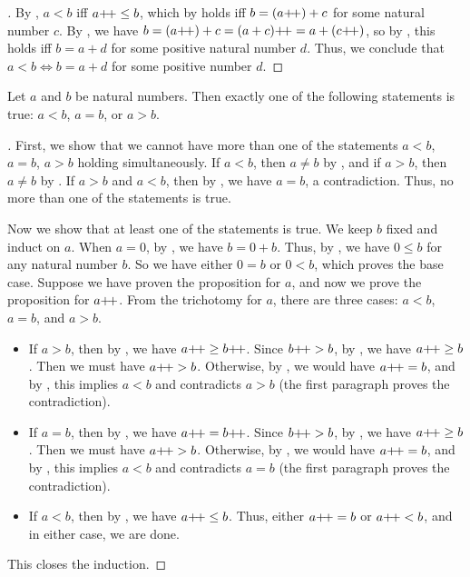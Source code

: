 \begin{proof}[]
  By , \(a < b\) iff \(a{+}\!{+} \leq b\), which by  holds iff \(b = (a{+}\!{+}) + c\) for some natural number \(c\).
  By , we have \(b = (a{+}\!{+}) + c = (a + c){+}\!{+} = a + (c{+}\!{+})\), so by , this holds iff \(b = a + d\) for some positive natural number \(d\).
  Thus, we conclude that \(a < b \iff b = a + d\) for some positive number \(d\).
\end{proof}

\begin{prop}\label{i:2.2.13}
  Let \(a\) and \(b\) be natural numbers.
  Then exactly one of the following statements is true: \(a < b\), \(a = b\), or \(a > b\).
\end{prop}

\begin{proof}[]
  First, we show that we cannot have more than one of the statements \(a < b\), \(a = b\), \(a > b\) holding simultaneously.
  If \(a < b\), then \(a \neq b\) by , and if \(a > b\), then \(a \neq b\) by .
  If \(a > b\) and \(a < b\), then by , we have \(a = b\), a contradiction.
  Thus, no more than one of the statements is true.

  Now we show that at least one of the statements is true.
  We keep \(b\) fixed and induct on \(a\).
  When \(a = 0\), by , we have \(b = 0 + b\).
  Thus, by , we have \(0 \leq b\) for any natural number \(b\).
  So we have either \(0 = b\) or \(0 < b\), which proves the base case.
  Suppose we have proven the proposition for \(a\), and now we prove the proposition for \(a{+}\!{+}\).
  From the trichotomy for \(a\), there are three cases: \(a < b\), \(a = b\), and \(a > b\).
  \begin{itemize}
    \item If \(a > b\), then by , we have \(a{+}\!{+} \geq b{+}\!{+}\).
          Since \(b{+}\!{+} > b\), by , we have \(a{+}\!{+} \geq b\).
          Then we must have \(a{+}\!{+} > b\).
          Otherwise, by , we would have \(a{+}\!{+} = b\), and by , this implies \(a < b\) and contradicts \(a > b\)
          (the first paragraph proves the contradiction).
    \item If \(a = b\), then by , we have \(a{+}\!{+} = b{+}\!{+}\).
          Since \(b{+}\!{+} > b\), by , we have \(a{+}\!{+} \geq b\).
          Then we must have \(a{+}\!{+} > b\).
          Otherwise, by , we would have \(a{+}\!{+} = b\), and by , this implies \(a < b\) and contradicts \(a = b\)
          (the first paragraph proves the contradiction).
    \item If \(a < b\), then by , we have \(a{+}\!{+} \leq b\).
          Thus, either \(a{+}\!{+} = b\) or \(a{+}\!{+} < b\), and in either case, we are done.
  \end{itemize}
  This closes the induction.
\end{proof}

